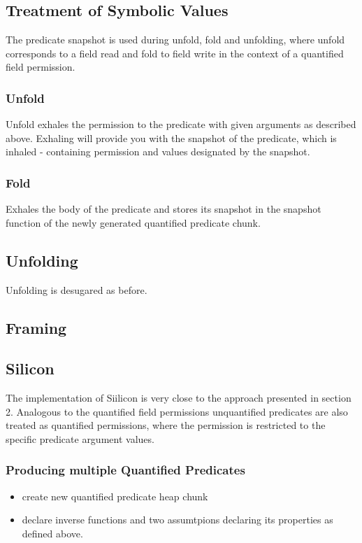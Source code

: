 \documentclass[12pt]{article}
\begin{document}
\subsection{Treatment of Symbolic Values}
The predicate snapshot is used during unfold, fold and unfolding, where unfold corresponds to a field read and fold to field write in the context of a quantified field permission.


\subsubsection{Unfold}
Unfold exhales the permission to the predicate with given arguments as described above. Exhaling will provide you with the snapshot of the predicate, which is inhaled - containing permission and values designated by the snapshot.

\subsubsection{Fold}
Exhales the body of the predicate and stores its snapshot in the  snapshot function of the newly generated quantified predicate chunk.

\subsection{Unfolding}
Unfolding is desugared as before.

\subsection{Framing}

\subsection{Silicon}
The implementation of Siilicon is very close to the approach presented in section 2.
Analogous to the quantified field permissions unquantified predicates are also treated as quantified permissions, where the permission is restricted to the specific predicate argument values.

\subsubsection{Producing multiple Quantified Predicates}
\begin{itemize}
\item create new quantified predicate heap chunk
\item declare inverse functions and two assumtpions declaring its properties as defined above.
\end{itemize}
\end{document}
